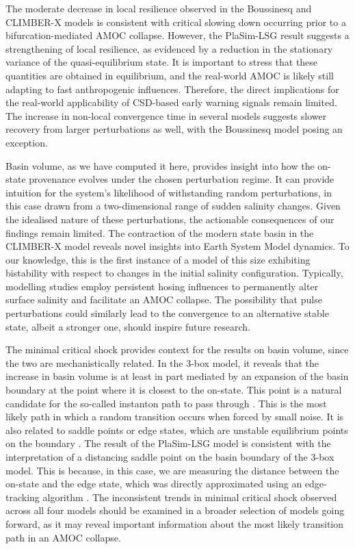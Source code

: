 \documentclass[12pt, a4paper]{article}
\begin{document}
The moderate decrease in local resilience observed in the Boussinesq and CLIMBER-X models is consistent with critical slowing down occurring prior to a bifurcation-mediated AMOC collapse. However, the PlaSim-LSG result suggests a strengthening of local resilience, as evidenced by a reduction in the stationary variance of the quasi-equilibrium state. It is important to stress that these quantities are obtained in equilibrium, and the real-world AMOC is likely still adapting to fast anthropogenic influences. Therefore, the direct implications for the real-world applicability of CSD-based early warning signals remain limited. The increase in non-local convergence time in several models suggests slower recovery from larger perturbations as well, with the Boussinesq model posing an exception.

Basin volume, as we have computed it here, provides insight into how the on-state provenance evolves under the chosen perturbation regime. It can provide intuition for the system's likelihood of withstanding random perturbations, in this case drawn from a two-dimensional range of sudden salinity changes. Given the idealised nature of these perturbations, the actionable consequences of our findings remain limited. The contraction of the modern state basin in the CLIMBER-X model reveals novel insights into Earth System Model dynamics. To our knowledge, this is the first instance of a model of this size exhibiting bistability with respect to changes in the initial salinity configuration. Typically, modelling studies employ persistent hosing influences to permanently alter surface salinity and facilitate an AMOC collapse. The possibility that pulse perturbations could similarly lead to the convergence to an alternative stable state, albeit a stronger one, should inspire future research.

The minimal critical shock provides context for the results on basin volume, since the two are mechanistically related. In the 3-box model, it reveals that the increase in basin volume is at least in part mediated by an expansion of the basin boundary at the point where it is closest to the on-state. This point is a natural candidate for the so-called instanton path to pass through \citep{Grafke2019NumericalComputationRare, Soons2025MostLikelyNoiseinduced}. This is the most likely path in which a random transition occurs when forced by small noise. It is also related to saddle points or edge states, which are unstable equilibrium points on the boundary \citep{Lucarini2017EdgeTracking, Lohmann2025EdgeStatesEWS}. The result of the PlaSim-LSG model is consistent with the interpretation of a distancing saddle point on the basin boundary of the 3-box model. This is because, in this case, we are measuring the distance between the on-state and the edge state, which was directly approximated using an edge-tracking algorithm \citep{Borner2026GlobalStabilityAtlantic}. The inconsistent trends in minimal critical shock observed across all four models should be examined in a broader selection of models going forward, as it may reveal important information about the most likely transition path in an AMOC collapse.
\end{document}
